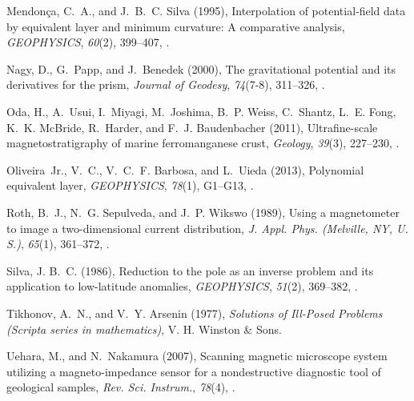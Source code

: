 \documentclass[galley,gc]{agutex}
\begin{document}
\begin{article}
\begin{thebibliography}{40}
Mendon\c{c}a, C.~A., and J.~B.~C. Silva (1995), Interpolation of
  potential‐field data by equivalent layer and minimum curvature: A
  comparative analysis, \textit{GEOPHYSICS}, \textit{60}(2), 399--407,
  .

Nagy, D., G.~Papp, and J.~Benedek (2000), The gravitational potential and its
  derivatives for the prism, \textit{Journal of Geodesy}, \textit{74}(7-8),
  311--326, .

Oda, H., A.~Usui, I.~Miyagi, M.~Joshima, B.~P. Weiss, C.~Shantz, L.~E. Fong,
  K.~K. McBride, R.~Harder, and F.~J. Baudenbacher (2011), Ultrafine-scale
  magnetostratigraphy of marine ferromanganese crust, \textit{Geology},
  \textit{39}(3), 227--230, .

Oliveira~Jr., V.~C., V.~C.~F. Barbosa, and L.~Uieda (2013), Polynomial
  equivalent layer, \textit{GEOPHYSICS}, \textit{78}(1), G1--G13,
  .

Roth, B.~J., N.~G. Sepulveda, and J.~P. Wikswo (1989), Using a magnetometer to
  image a two-dimensional current distribution, \textit{J. Appl. Phys.
  (Melville, NY, U. S.)}, \textit{65}(1), 361--372, .

Silva, J. B.~C. (1986), Reduction to the pole as an inverse problem and its
  application to low-latitude anomalies, \textit{GEOPHYSICS}, \textit{51}(2),
  369--382, .

Tikhonov, A.~N., and V.~Y. Arsenin (1977), \textit{Solutions of Ill-Posed
  Problems (Scripta series in mathematics)}, V. H. Winston \& Sons.

Uehara, M., and N.~Nakamura (2007), Scanning magnetic microscope system
  utilizing a magneto-impedance sensor for a nondestructive diagnostic tool of
  geological samples, \textit{Rev. Sci. Instrum.}, \textit{78}(4),
  .


\end{thebibliography}
\end{article}
\end{document}

